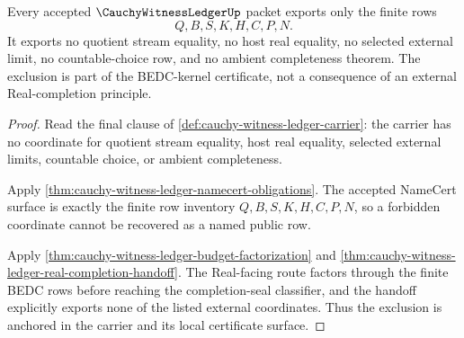 \begin{theorem}
\label{thm:cauchy-witness-ledger-forbidden-coordinate-exclusion}
Every accepted $\CauchyWitnessLedgerUp$ packet exports only the finite rows
$$
Q,B,S,K,H,C,P,N.
$$
It exports no quotient stream equality, no host real equality, no selected external limit, no countable-choice row, and no ambient completeness theorem. The exclusion is part of the BEDC-kernel certificate, not a consequence of an external Real-completion principle.
\end{theorem}
\begin{proof}
Read the final clause of \autoref{def:cauchy-witness-ledger-carrier}: the carrier has no coordinate for quotient stream equality, host real equality, selected external limits, countable choice, or ambient completeness.

Apply \autoref{thm:cauchy-witness-ledger-namecert-obligations}. The accepted NameCert surface is exactly the finite row inventory $Q,B,S,K,H,C,P,N$, so a forbidden coordinate cannot be recovered as a named public row.

Apply \autoref{thm:cauchy-witness-ledger-budget-factorization} and \autoref{thm:cauchy-witness-ledger-real-completion-handoff}. The Real-facing route factors through the finite BEDC rows before reaching the completion-seal classifier, and the handoff explicitly exports none of the listed external coordinates. Thus the exclusion is anchored in the carrier and its local certificate surface.
\end{proof}

